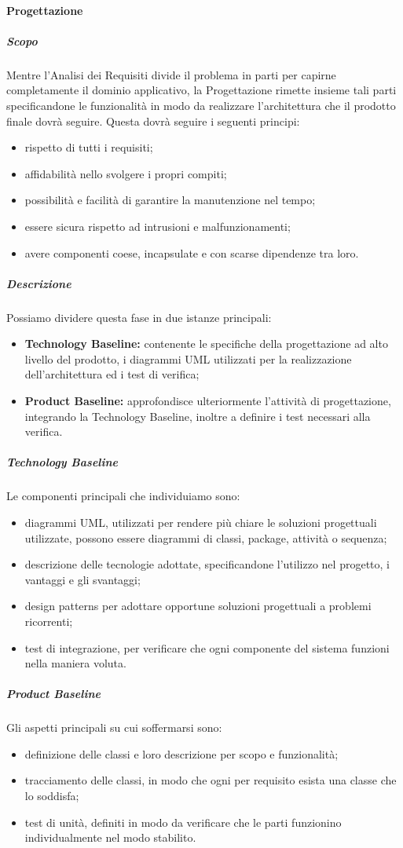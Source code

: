 			\paragraph{Progettazione}
			\subparagraph{Scopo}
			Mentre l'Analisi dei Requisiti divide il problema in parti per capirne completamente il dominio applicativo, la Progettazione rimette insieme tali parti specificandone le funzionalità in modo da realizzare l'architettura che il prodotto finale dovrà seguire. Questa dovrà seguire i seguenti principi:
			\begin{itemize}
				\item rispetto di tutti i requisiti;
				\item affidabilità nello svolgere i propri compiti;
				\item possibilità e facilità di garantire la manutenzione nel tempo;
				\item essere sicura rispetto ad intrusioni e malfunzionamenti;
				\item avere componenti coese, incapsulate e con scarse dipendenze tra loro.
			\end{itemize}
			\subparagraph{Descrizione}
			Possiamo dividere questa fase in due istanze principali:
			\begin{itemize}
				\item \textbf{Technology Baseline:} contenente le specifiche della progettazione ad alto livello del prodotto, i diagrammi UML utilizzati per la realizzazione dell'architettura ed i test di verifica;
				\item \textbf{Product Baseline:} approfondisce ulteriormente l'attività di progettazione, integrando la Technology Baseline, inoltre a definire i test necessari alla verifica.
			\end{itemize}
			\subparagraph{Technology Baseline}
			Le componenti principali che individuiamo sono:
			\begin{itemize}
				\item diagrammi UML, utilizzati per rendere più chiare le soluzioni progettuali utilizzate, possono essere diagrammi di classi, package, attività o sequenza;
				\item descrizione delle tecnologie adottate, specificandone l'utilizzo nel progetto, i vantaggi e gli svantaggi;
				\item design patterns per adottare opportune soluzioni progettuali a problemi ricorrenti;
				\item test di integrazione, per verificare che ogni componente del sistema funzioni nella maniera voluta.
			\end{itemize}
			\subparagraph{Product Baseline}
			Gli aspetti principali su cui soffermarsi sono:
			\begin{itemize}
				\item definizione delle classi e loro descrizione per scopo e funzionalità;
				\item tracciamento delle classi, in modo che ogni per requisito esista una classe che lo soddisfa;
				\item test di unità, definiti in modo da verificare che le parti funzionino individualmente nel modo stabilito.
			\end{itemize}

